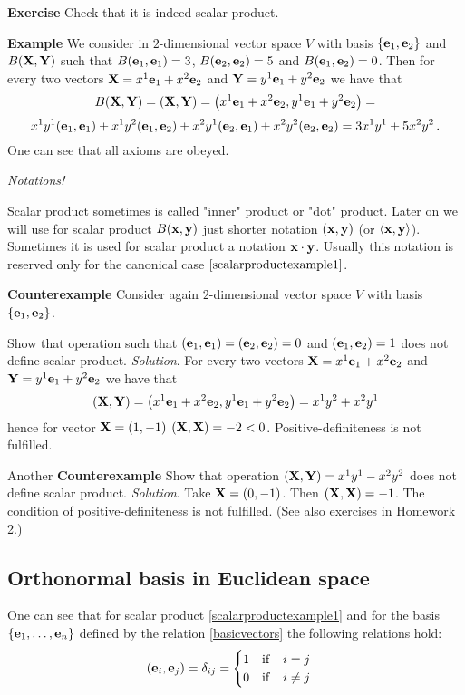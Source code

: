 \documentclass[12pt]{article}
\numberwithin{equation}{section}
\begin{document}
{\bf Exercise}  Check that it is indeed scalar product.

\smallskip

{\bf Example} We consider in $2$-dimensional 
vector space $V$ with basis $\{{\bf e}_1,{\bf e}_2\}$ and
$B({\bf X},{\bf Y})$ such that $B({\bf e}_1,{\bf e}_1)=3$,  $B({\bf e}_2,{\bf e}_2)=5$ and  $B({\bf e}_1,{\bf e}_2)=0$.
Then for every two vectors ${\bf X}=x^1{\bf e}_1+x^2{\bf e}_2$ and ${\bf Y}=y^1{\bf e}_1+y^2{\bf e}_2$ we have that
                        $$
     B({\bf X},{\bf Y}) =\left({\bf X},{\bf Y}\right)=\left(x^1{\bf e}_1+x^2{\bf e}_2,y^1{\bf e}_1+y^2{\bf e}_2\right)=
              $$
              $$
   x^1y^1({\bf e}_1,{\bf e}_1)+x^1y^2({\bf e}_1,{\bf e}_2)+
   x^2y^1({\bf e}_2,{\bf e}_1)+
   x^2y^2({\bf e}_2,{\bf e}_2)=
      3x^1y^1+5x^2y^2\,.
                        $$
One can see that all axioms are obeyed.

\centerline {\it Notations!}

Scalar product sometimes is called "inner" product
 or "dot" product.
Later on we will use for scalar product $B({\bf x},{\bf y})$ just shorter notation
$({\bf x},{\bf y})$ (or $\langle{\bf x},{\bf y}\rangle$).
Sometimes it is used for scalar product a notation ${\bf x} \cdot {\bf y}$.
Usually this notation is reserved only for
the canonical case $\eqref{scalarproductexample1}$.

\smallskip



{\bf Counterexample}  Consider  again $2$-dimensional 
vector space $V$ with basis $\{{\bf e}_1,{\bf e}_2\}$.


Show that operation such that $({\bf e}_1,{\bf e}_1)=({\bf e}_2,{\bf e}_2)=0$ and $({\bf e}_1,{\bf e}_2)=1$
does not define scalar product.
{\it Solution}. For every two vectors ${\bf X}=x^1{\bf e}_1+x^2{\bf e}_2$ and 
${\bf Y}=y^1{\bf e}_1+y^2{\bf e}_2$ we have that
                        $$
\left({\bf X},{\bf Y}\right)=\left(x^1{\bf e}_1+x^2{\bf e}_2,y^1{\bf e}_1+y^2{\bf e}_2\right)=x^1y^2+x^2y^1
              $$
hence for vector ${\bf X}=(1,-1)$ $({\bf X},{\bf X})=-2<0$. Positive-definiteness is not fulfilled.

Another {\bf Counterexample}  
Show that operation $({\bf X},{\bf Y})=x^1y^1-x^2y^2$ does not define scalar product.
{\it Solution}. Take ${\bf X}=(0,-1)$. Then $({\bf X},{\bf X})=-1$. The condition of positive-definiteness is not fulfilled.
(See also exercises in Homework 2.)




\subsection {Orthonormal basis in Euclidean space}

One can see that for scalar product  \eqref{scalarproductexample1}
and for the basis $\{{\bf e}_1,\dots,{\bf e}_n\}$ defined by the relation \eqref{basicvectors}
the following relations hold:
\begin{equation}\label{orthonormalbasis}
    ({\bf e}_i,{\bf e}_j)=\delta_{ij}= \begin {cases}
                  1\quad {\rm if}\quad i=j\\
              0\quad {\rm if}\quad i\not=j
                         \end{cases}
\end{equation}
\end{document}
